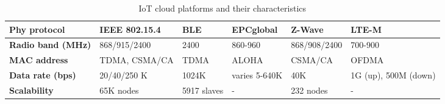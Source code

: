 \begin{table}[h!]
	\small
	\begin{tabulary}{\textwidth}{L|L|L|L|L|L}
	\bf{Phy protocol}     & \bf{IEEE 802.15.4} & \bf{BLE}    & \bf{EPCglobal} & \bf{Z-Wave}  & \bf{LTE-M}          \\\hline
	\bf{Radio band (MHz)} & 868/915/2400       & 2400        & 860-960        & 868/908/2400 & 700-900             \\\hline
	\bf{MAC address}      & TDMA, CSMA/CA      & TDMA        & ALOHA          & CSMA/CA      & OFDMA               \\\hline
	\bf{Data rate (bps)}  & 20/40/250 K        & 1024K       & varies 5-640K  & 40K          & 1G (up), 500M (down)\\\hline
	\bf{Scalability}      & 65K nodes          & 5917 slaves & -              & 232 nodes    & -                   \\\hline
	\end{tabulary}
	\caption{\label{tab:IoT_cloud} IoT cloud platforms and their characteristics \cite{al-fuqaha_internet_24}}
\end{table}

